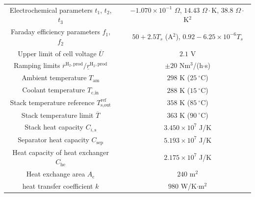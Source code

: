 \documentclass[review,3p,10pt]{elsarticle}
\begin{document}
\begin{table}[h]
\begin{tabular}{ccc}
  Electrochemical parameters $t_1$, $t_2$, $t_3$                                & & $-1.070\times10^{-1}$ $\Omega$, $14.43$ $\Omega\cdot$K, $38.8$ $\Omega\cdot$K$^2$ \\
  Faraday efficiency parameters $f_1$, $f_2$                                    & & $50+ 2.5 T_s$ (A$^2$), $0.92-6.25\times10^{-6}T_s$   \\
  Upper limit of cell voltage $\overline{U}$                                    & & $2.1$ V \\
  Ramping limits $\overline{r}^{\text{H}_2,\text{prod}} / \underline{r}^{\text{H}_2,\text{prod} }$    & & $\pm 20$ Nm$^3$/(h$\cdot$s)         \\
  \hline
  Ambient temperature $T_{\text{am}}$                                           & & $298$ K ($25\ ^\circ$C) \\
  Coolant temperature $T_{\text{c,in}}$                                         & & $288$ K ($15\ ^\circ$C) \\
  Stack temperature reference $T^{\text{ref}}_{\text{s,out}}$                   & & $358$ K ($85\ ^\circ$C) \\
  Stack temperature limit $\overline{T}$                                        & & $363$ K ($90\ ^\circ$C) \\
  Stack heat capacity $C_{i,\text{s}}$                                          & & $3.450\times10^7$ J/K    \\
  Separator heat capacity $C_{\text{sep}}$                                      & & $5.193\times10^7$ J/K    \\
  Heat capacity of heat exchanger $C_{\text{he}}$                               & & $2.175\times10^7$ J/K    \\
  Heat exchange area $A_{\text{c}}$                                             & & $240$ m$^2$    \\
  heat transfer coefficient $k$                                                 & & $980$ W/K$\cdot$m$^2$         \\

\end{tabular}
\end{table}
\end{document}
